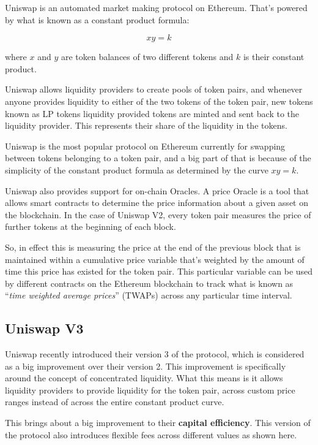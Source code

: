 Uniswap is an automated market making protocol on Ethereum. That's
powered by what is known as a constant product formula:

\[xy=k\]

where $x$ and $y$ are token balances of two different tokens and
$k$ is their constant product.

Uniswap allows liquidity providers to create pools of token pairs, and
whenever anyone provides liquidity to either of the two tokens of the
token pair, new tokens known as LP tokens liquidity provided tokens are
minted and sent back to the liquidity provider. This represents their
share of the liquidity in the tokens.

Uniswap is the most popular protocol on Ethereum currently for swapping
between tokens belonging to a token pair, and a big part of that is
because of the simplicity of the constant product formula as determined
by the curve $xy=k$.

Uniswap also provides support for on-chain Oracles. A price Oracle is a
tool that allows smart contracts to determine the price information
about a given asset on the blockchain. In the case of Uniswap V2, every
token pair measures the price of further tokens at the beginning of each
block.

So, in effect this is measuring the price at the end of the previous
block that is maintained within a cumulative price variable that's
weighted by the amount of time this price has existed for the token
pair. This particular variable can be used by different contracts on the
Ethereum blockchain to track what is known as ``\emph{time weighted
average prices}'' (TWAPs) across any particular time interval.

\subsection{Uniswap V3}\label{uniswap-v3}

Uniswap recently introduced their version 3 of the protocol, which is
considered as a big improvement over their version 2. This improvement
is specifically around the concept of concentrated liquidity. What this
means is it allows liquidity providers to provide liquidity for the
token pair, across custom price ranges instead of across the entire
constant product curve.

This brings about a big improvement to their \textbf{capital
efficiency}. This version of the protocol also introduces flexible fees
across different values as shown here.

